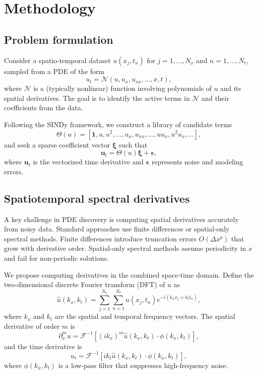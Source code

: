 \documentclass[preprint,12pt]{elsarticle}
\begin{document}
\section{Methodology}
\label{sec:method}

\subsection{Problem formulation}

Consider a spatio-temporal dataset $u(x_j, t_n)$ for $j = 1, \ldots, N_x$ and $n = 1, \ldots, N_t$, sampled from a PDE of the form
\begin{equation}
u_t = \mathcal{N}(u, u_x, u_{xx}, \ldots, x, t),
\end{equation}
where $\mathcal{N}$ is a (typically nonlinear) function involving polynomials of $u$ and its spatial derivatives. The goal is to identify the active terms in $\mathcal{N}$ and their coefficients from the data.

Following the SINDy framework, we construct a library of candidate terms
\begin{equation}
\Theta(u) = [\mathbf{1}, u, u^2, \ldots, u_x, u_{xx}, \ldots, u u_x, u^2 u_x, \ldots],
\end{equation}
and seek a sparse coefficient vector $\boldsymbol{\xi}$ such that
\begin{equation}
\mathbf{u}_t = \Theta(u) \boldsymbol{\xi} + \boldsymbol{\epsilon},
\end{equation}
where $\mathbf{u}_t$ is the vectorized time derivative and $\boldsymbol{\epsilon}$ represents noise and modeling errors.

\subsection{Spatiotemporal spectral derivatives}
\label{sec:spacetime}

A key challenge in PDE discovery is computing spatial derivatives accurately from noisy data. Standard approaches use finite differences or spatial-only spectral methods. Finite differences introduce truncation errors $O(\Delta x^p)$ that grow with derivative order. Spatial-only spectral methods assume periodicity in $x$ and fail for non-periodic solutions.

We propose computing derivatives in the combined space-time domain. Define the two-dimensional discrete Fourier transform (DFT) of $u$ as
\begin{equation}
\hat{u}(k_x, k_t) = \sum_{j=1}^{N_x} \sum_{n=1}^{N_t} u(x_j, t_n) e^{-i(k_x x_j + k_t t_n)},
\end{equation}
where $k_x$ and $k_t$ are the spatial and temporal frequency vectors. The spatial derivative of order $m$ is
\begin{equation}
\partial_x^m u = \mathcal{F}^{-1}\left[(i k_x)^m \hat{u}(k_x, k_t) \cdot \phi(k_x, k_t)\right],
\end{equation}
and the time derivative is
\begin{equation}
u_t = \mathcal{F}^{-1}\left[i k_t \hat{u}(k_x, k_t) \cdot \phi(k_x, k_t)\right],
\end{equation}
where $\phi(k_x, k_t)$ is a low-pass filter that suppresses high-frequency noise.
\end{document}
